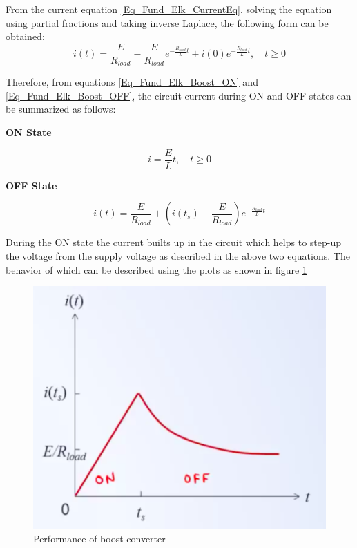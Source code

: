 From the current equation \eqref{Eq_Fund_Elk_CurrentEq}, solving the equation using partial fractions and taking inverse Laplace, the following form can be obtained:
\begin{equation}
	i(t) = \frac{E}{R_{load}} - \frac{E}{R_{load}} e^{-\frac{R_{load}}{L}t} + i(0) e^{-\frac{R_{load}}{L}t}, \quad t \geq 0 \label{Eq_Fund_Elk_Boost_OFF}
\end{equation}

Therefore, from equations \eqref{Eq_Fund_Elk_Boost_ON} and \eqref{Eq_Fund_Elk_Boost_OFF}, the circuit current during ON and OFF states can be summarized as follows:

\textbf{ON State}

\begin{equation*}
	i = \frac{E}{L} t, \quad t \geq 0
\end{equation*}

\textbf{OFF State}

\begin{equation*}
	i(t) = \frac{E}{R_{load}} + \left( i(t_s) - \frac{E}{R_{load}} \right)  e^{-\frac{R_{load}}{L}t}
\end{equation*}

During the ON state the current builts up in the circuit which helps to step-up the voltage from the supply voltage as described in the above two equations. The behavior of which can be described using the plots as shown in figure \ref{Fig_Fund_ELK_Boost_Performance}

\begin{figure}[h!]
	\centering
	\includegraphics[width=0.75\linewidth]{Bilder/Fund_ELK_Boost_Perforance}
	\caption{Performance of boost converter}
	\label{Fig_Fund_ELK_Boost_Performance}
\end{figure}

